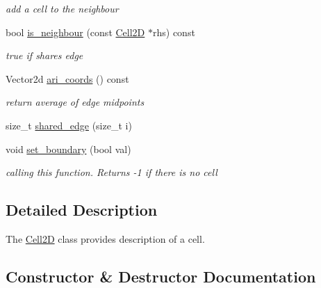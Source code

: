 \begin{DoxyCompactItemize}
\begin{DoxyCompactList}\small\item\em add a cell to the neighbour \end{DoxyCompactList}\item 
\mbox{\label{classHCore2D_1_1Cell2D_a557da6f9e39c77c05bb2d42108d1728d}} 
bool \hyperlink{classHCore2D_1_1Cell2D_a557da6f9e39c77c05bb2d42108d1728d}{is\+\_\+neighbour} (const \hyperlink{classHCore2D_1_1Cell2D}{Cell2D} $\ast$rhs) const
\begin{DoxyCompactList}\small\item\em true if shares edge \end{DoxyCompactList}\item 
\mbox{\label{classHCore2D_1_1Cell2D_adea88b0500005fa433bc4bb63b74a29b}} 
Vector2d \hyperlink{classHCore2D_1_1Cell2D_adea88b0500005fa433bc4bb63b74a29b}{ari\+\_\+coords} () const
\begin{DoxyCompactList}\small\item\em return average of edge midpoints \end{DoxyCompactList}\item 
size\+\_\+t \hyperlink{classHCore2D_1_1Cell2D_a7ec95ac9c1ef2551f6ca2a4b2078ee40}{shared\+\_\+edge} (size\+\_\+t i)
\item 
void \hyperlink{classHCore2D_1_1Cell2D_a05ea21ad89b3caec0d71ca543e3c7247}{set\+\_\+boundary} (bool val)
\begin{DoxyCompactList}\small\item\em calling this function. Returns -\/1 if there is no cell \end{DoxyCompactList}\end{DoxyCompactItemize}


\subsection{Detailed Description}
The \hyperlink{classHCore2D_1_1Cell2D}{Cell2D} class provides description of a cell. 

\subsection{Constructor \& Destructor Documentation}
\mbox{\label{classHCore2D_1_1Cell2D_a6c10c6ca8ed2368091ce15af8e455d4e}} 
